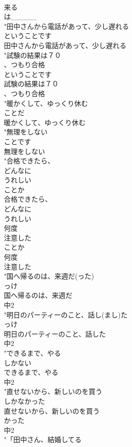 \documentclass[8pt]{extreport}
\begin{document}
\begin{CJK}{UTF8}{min}
\\	来る
\\	は_____
\\	"田中さんから電話があって、少し遅れる
\\	ということです
\\	田中さんから電話があって、少し遅れる
\\	"試験の結果は７０
\\	、つもり合格
\\	ということです
\\	試験の結果は７０
\\	、つもり合格
\\	"暖かくして、ゆっくり休む
\\	ことだ
\\	暖かくして、ゆっくり休む
\\	"無理をしない
\\	ことです
\\	無理をしない
\\	"合格できたら、
\\	どんなに
\\	うれしい
\\	ことか
\\	合格できたら、
\\	どんなに
\\	うれしい
\\	何度
\\	注意した
\\	ことか
\\	何度
\\	注意した
\\	"国へ帰るのは、来週だ(った)
\\	っけ
\\	国へ帰るのは、来週だ
\\	中2
\\	"明日のパーティーのこと、話し(まし)た
\\	っけ
\\	明日のパーティーのこと、話した
\\	中2
\\	"できるまで、やる
\\	しかない
\\	できるまで、やる
\\	中2
\\	"直せないから、新しいのを買う
\\	しかなかった
\\	直せないから、新しいのを買う
\\	かった
\\	中2
\\	"「田中さん、結婚してる

\end{CJK}
\end{document}
